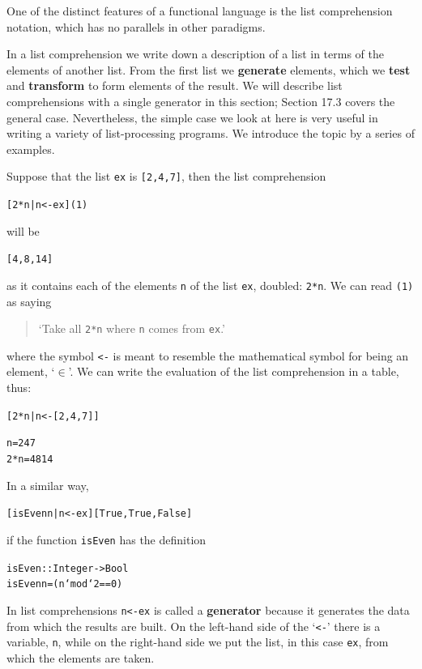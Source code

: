 One of the distinct features of a functional language is the list
comprehension notation, which has no parallels in other paradigms.

In a list comprehension we write down a description of a list in terms
of the elements of another list. From the first list we
\textbf{generate} elements, which we \textbf{test} and
\textbf{transform} to form elements of the result. We will describe 
list comprehensions with a single generator in this section; Section
17.3 covers the general case. Nevertheless, the simple case we
look at here is very useful in writing a variety of list-processing
programs. We introduce the topic by a series of examples.

\begin{example}
Suppose that the list \texttt{ex} is \texttt{[2,4,7]}, then the list
comprehension
\begin{alltt}
[ 2*n | n<-ex]\hfill (1)
\end{alltt}
will be
\begin{alltt}
[4,8,14]
\end{alltt}
as it contains each of the elements \texttt{n} of the list \texttt{ex}, doubled:
\texttt{2*n}. We can read \texttt{(1)} as saying
\begin{quote}
`Take all \texttt{2*n} where \texttt{n} comes from \texttt{ex}.'
\end{quote}
where the symbol \texttt{<-}\minx{<-} is meant to resemble the mathematical symbol for
being an element, `$\in$'. We can write the evaluation of the list
comprehension in a table, thus:
\begin{alltt}
[ 2*n | n <- [2,4,7] ] 
 
  n   =   2   4   7
2*n   =   4   8  14
\end{alltt}

In a similar way, 
\begin{alltt}
[ isEven n | n<-ex ] \step{}[True,True,False]
\end{alltt}
if the function \texttt{isEven} has the 
definition
\begin{alltt}
isEven :: Integer -> Bool
isEven n = (n `mod` 2 == 0)
\end{alltt} 
In
list comprehensions \texttt{n<-ex} is called a {\bf generator} because it
generates the data from which the results are built. On the left-hand side
of the `\texttt{<-}'\minx{<-}
there is a variable, \texttt{n}, while on the right-hand
side we put the list, in this case \texttt{ex}, from which the elements are taken.



\end{example}
